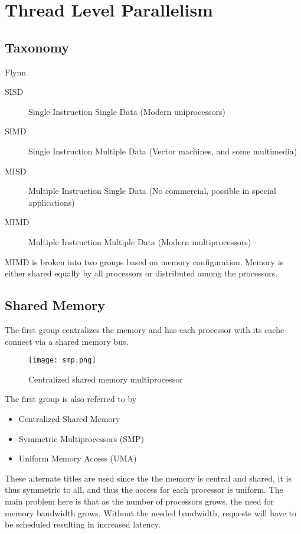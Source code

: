 \chapter{Thread Level Parallelism}
\label{c-tlp}

\section{Taxonomy}

Flynn
\begin{description}
    \item[SISD] Single Instruction Single Data (Modern uniprocessors)
    \item[SIMD] Single Instruction Multiple Data (Vector machines, and some multimedia)
    \item[MISD] Multiple Instruction Single Data (No commercial, possible in special applications)
    \item[MIMD] Multiple Instruction Multiple Data (Modern multiprocessors)
\end{description}


MIMD is broken into two groups based on memory configuration.  Memory is either shared equally by all processors or distributed among the processors.

\section{Shared Memory}

The first group centralizes the memory and has each processor with its cache connect via a shared memory bus.

\begin{figure}[h]
  \begin{center}
  \texttt{[image: smp.png]} \\
  \caption{Centralized shared memory multiprocessor}\label{f-smp}
  \end{center}
\end{figure}

The first group is also referred to by
\begin{itemize}
    \item Centralized Shared Memory
    \item Symmetric Multiprocessors (SMP)
    \item Uniform Memory Access (UMA)
\end{itemize}
These alternate titles are used since the the memory is central and shared, it is thus symmetric to all, and thus the access for each processor is uniform.  The main problem here is that as the number of processors grows, the need for memory bandwidth grows.  Without the needed bandwidth, requests will have to be scheduled resulting in increased latency.

